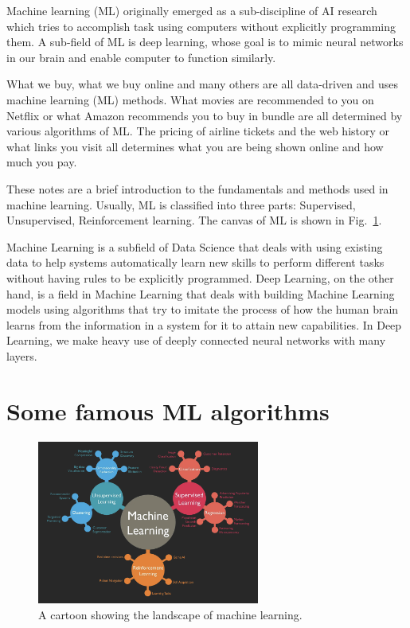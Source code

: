 \documentclass[11pt]{article}
\begin{document}
	
	Machine learning (ML) originally emerged as a sub-discipline of AI research which tries to accomplish task 
	using computers without explicitly programming them. A sub-field of ML is deep learning, whose goal is to mimic
	neural networks in our brain and enable computer to function similarly. 
	
	
	What we buy, what we buy online and many others
	are all data-driven and uses machine learning (ML) methods. What movies are recommended to you on Netflix or what Amazon
	recommends you to buy in bundle are all determined by various algorithms of ML. The pricing of airline tickets and the web history 
	or what links you visit all determines what you are being shown online and how much you pay. 
	
	These notes are a brief introduction to the fundamentals and methods used in machine learning. Usually, ML is 
	classified into three parts: Supervised, Unsupervised, Reinforcement learning. The canvas of ML is shown in Fig.~\ref{fig:EXP}. 
	
	
	Machine Learning is a subfield of Data Science that deals with using existing data to help systems automatically learn new skills to perform different 	tasks without having rules to be explicitly programmed. Deep Learning, on the other hand, is a field in Machine Learning that deals with building Machine 	Learning models using algorithms that try to imitate the process of how the human brain learns from the information in a system for it to attain new 		capabilities. In Deep Learning, we make heavy use of deeply connected neural networks with many layers.
	
	
	
	
	\newpage
	\section{Some famous ML algorithms}
	
	
	

\begin{figure}
\centering 
\includegraphics[width=0.65\textwidth]{cartoonML.png}
\caption{\label{fig:EXP}A cartoon showing the landscape of machine learning.}
\end{figure}
	
\end{document}
